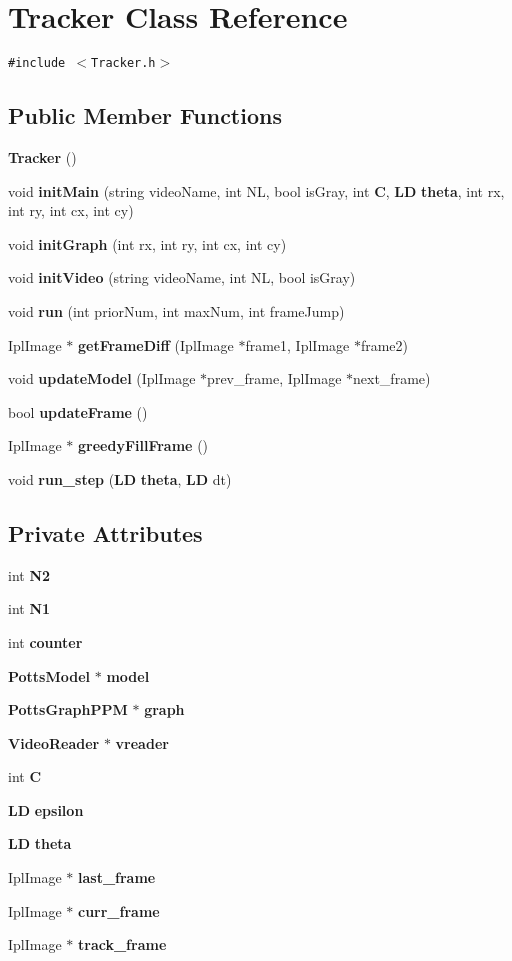 \section{Tracker Class Reference}
\label{classTracker}
{\tt \#include $<$Tracker.h$>$}

\subsection*{Public Member Functions}
\begin{CompactItemize}
\item 
{\bf Tracker} ()
\item 
void {\bf initMain} (string videoName, int NL, bool isGray, int {\bf C}, {\bf LD} {\bf theta}, int rx, int ry, int cx, int cy)
\item 
void {\bf initGraph} (int rx, int ry, int cx, int cy)
\item 
void {\bf initVideo} (string videoName, int NL, bool isGray)
\item 
void {\bf run} (int priorNum, int maxNum, int frameJump)
\item 
IplImage $\ast$ {\bf getFrameDiff} (IplImage $\ast$frame1, IplImage $\ast$frame2)
\item 
void {\bf updateModel} (IplImage $\ast$prev\_\-frame, IplImage $\ast$next\_\-frame)
\item 
bool {\bf updateFrame} ()
\item 
IplImage $\ast$ {\bf greedyFillFrame} ()
\item 
void {\bf run\_\-step} ({\bf LD} {\bf theta}, {\bf LD} dt)
\end{CompactItemize}
\subsection*{Private Attributes}
\begin{CompactItemize}
\item 
int {\bf N2}
\item 
int {\bf N1}
\item 
int {\bf counter}
\item 
{\bf PottsModel} $\ast$ {\bf model}
\item 
{\bf PottsGraphPPM} $\ast$ {\bf graph}
\item 
{\bf VideoReader} $\ast$ {\bf vreader}
\item 
int {\bf C}
\item 
{\bf LD} {\bf epsilon}
\item 
{\bf LD} {\bf theta}
\item 
IplImage $\ast$ {\bf last\_\-frame}
\item 
IplImage $\ast$ {\bf curr\_\-frame}
\item 
IplImage $\ast$ {\bf track\_\-frame}
\end{CompactItemize}


